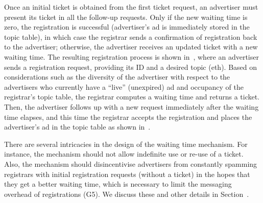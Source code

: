 

Once an initial ticket is obtained from the first ticket request, an advertiser must present its ticket in all the follow-up requests. Only if the new waiting time is zero, the registration is successful (\ie advertiser's ad is immediately stored in the topic table), in which case the registrar sends a confirmation of registration back to the advertiser; otherwise, the advertiser receives an updated ticket with a new waiting time. The resulting registration process is shown in~, where an advertiser sends a registration request, providing its ID and a desired topic (eth). Based on considerations such as the diversity of the advertiser with respect to the advertisers who currently have a ``live'' (\ie unexpired) ad and occupancy of the registrar's topic table, the registrar computes a waiting time and returns a ticket. Then, the advertiser follows up with a new request immediately after the waiting time elapses, and this time the registrar accepts the registration and places the advertiser's ad in the topic table as shown in~.

There are several intricacies in the design of the waiting time mechanism. For instance, the mechanism should not allow indefinite use or re-use of a ticket. Also, the mechanism should disincentivise advertisers from constantly spamming registrars with initial registration requests (without a ticket) in the hopes that they get a better waiting time, which is necessary to limit the messaging overhead of registrations (G5). We discuss these and other details in Section~. 

